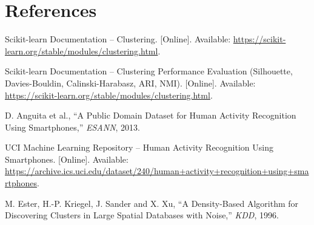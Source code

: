 \documentclass[12pt,a4paper]{article}
\begin{document}
\section{References}
\begin{enumerate}[label={[\arabic*]}]
\item Scikit-learn Documentation -- Clustering. [Online]. Available: \url{https://scikit-learn.org/stable/modules/clustering.html}.
\item Scikit-learn Documentation -- Clustering Performance Evaluation (Silhouette, Davies-Bouldin, Calinski-Harabasz, ARI, NMI). [Online]. Available: \url{https://scikit-learn.org/stable/modules/clustering.html}.
\item D. Anguita et al., ``A Public Domain Dataset for Human Activity Recognition Using Smartphones,'' \textit{ESANN}, 2013.
\item UCI Machine Learning Repository -- Human Activity Recognition Using Smartphones. [Online]. Available: \url{https://archive.ics.uci.edu/dataset/240/human+activity+recognition+using+smartphones}.
\item M. Ester, H.-P. Kriegel, J. Sander and X. Xu, ``A Density-Based Algorithm for Discovering Clusters in Large Spatial Databases with Noise,'' \textit{KDD}, 1996.
\end{enumerate}
\end{document}
